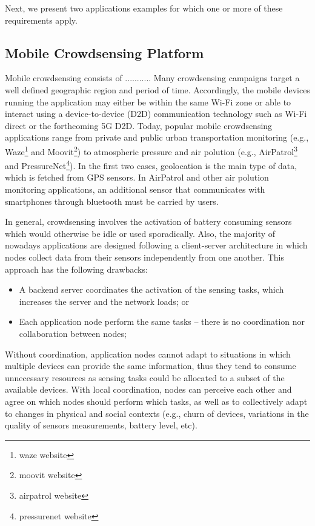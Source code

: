 
Next, we present two applications examples for which one or more of these requirements apply.
 
\subsection{Mobile Crowdsensing Platform}

Mobile crowdsensing consists of ........... Many crowdsensing campaigns target a well defined geographic region and period of time. Accordingly, the mobile devices running the application may either be within the same Wi-Fi zone or able to interact using a device-to-device (D2D) communication technology such as Wi-Fi direct or the forthcoming 5G D2D. Today, popular mobile crowdsensing applications range from private and public urban transportation monitoring (e.g., Waze\footnote{waze website} and Moovit\footnote{moovit website}) to atmospheric pressure and air polution (e.g., AirPatrol\footnote{airpatrol website} and PressureNet\footnote{pressurenet website}). In the first two cases, geolocation is the main type of data, which is fetched from GPS sensors. In AirPatrol and other air polution monitoring applications, an additional sensor that communicates with smartphones through bluetooth must be carried by users. 

In general, crowdsensing involves the activation of battery consuming sensors which would otherwise be idle or used sporadically. Also, the majority of nowadays applications are designed following a client-server architecture in which nodes collect data from their sensors independently from one another. This approach has the following drawbacks:

\begin{itemize}

\item A backend server coordinates the activation of the sensing tasks, which increases the server and the network loads; or

\item Each application node perform the same tasks -- there is no coordination nor collaboration between nodes; 

\end{itemize}

Without coordination, application nodes cannot adapt to situations in which multiple devices can provide the same information, thus they tend to consume unnecessary resources as sensing tasks could be allocated to a subset of the available devices. With local coordination, nodes can perceive each other and agree on which nodes should perform which tasks, as well as to collectively adapt to changes in physical and social contexts (e.g., churn of devices, variations in the quality of sensors measurements, battery level, etc). 

